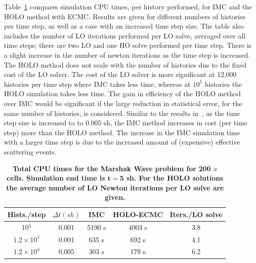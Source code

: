 \documentclass{mc2013}
\begin{document}
Table~\ref{marshak_table} compares simulation CPU times, per history performed, for IMC and the HOLO method
with ECMC.  Results are given for different numbers of histories per time step, as
well as a case with an increased time step size.  The table also includes the number of LO
iterations performed per LO solve, averaged over all time steps; there are two LO and
one HO solve performed per time step.  There is a slight increase in the number of
newton iterations as the time step is increased.  The HOLO method does not scale with the number of
histories due to the fixed cost of the LO solver.  The cost of the LO solver is more
significant at 12,000 histories per time step where IMC takes less time, whereas at
$10^5$ histories the HOLO simulation takes less time.    The gain in efficiency of
the HOLO method over IMC would be significant if the large reduction in statistical
error, for the same number of histories, is considered.  Similar to the results
in~\cite{park}, as the time step size is increased to to 0.005 sh, the IMC method
increases in cost (per time step) more than the HOLO method. The increase in the IMC
simulation time with a larger time step is due to the increased amount of (expensive) effective scattering
events.   
\begin{table}[H]
\centering
\caption{\label{marshak_table} \textbf{Total CPU times for the Marshak Wave problem
    for 200 $x$ cells.  Simulation end time is $\mathbf{t=5}$ sh. For the HOLO
    solutions the average number of LO Newton iterations per LO solve are given. }}
\vspace{-0.1in}
	\begin{tabular}{|cc|c|cc|}\hline
Hists./step & $\Delta t (sh)$ & IMC & HOLO-ECMC & Iters./LO solve \\ \hline
10$^5$                    &   0.001	& 5190 s &	4003 s & 3.8               \\
$1.2\times10^4 $   &    0.001	& 635   s &	   692 s   & 4.1               \\
$1.2\times10^4$     &   0.005	& 303   s &    179 s   & 6.2                \\ \hline
\end{tabular}
\end{table}
\end{document}
